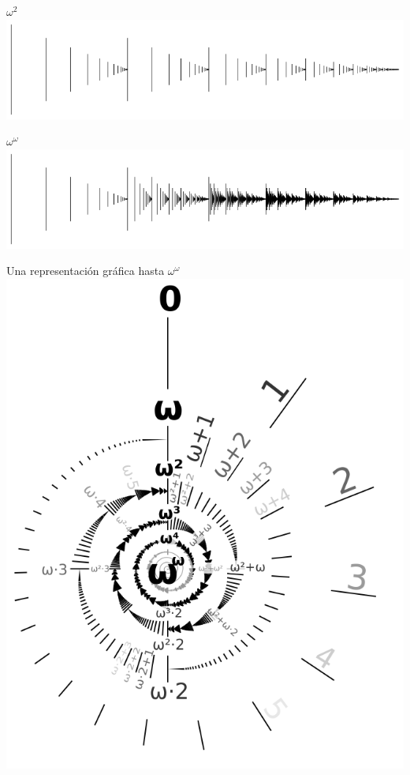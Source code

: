 \documentclass[10pt,spanish]{beamer}
\begin{document}
\begin{frame}{$\omega^2$}
\includegraphics[scale=0.4]{w^2.png}
\end{frame}

\begin{frame}{$\omega^\omega$}
\includegraphics[scale=0.4]{w^w.png}
\end{frame}

\begin{frame}{Una representación gráfica hasta $\omega^\omega$}
	\includegraphics[scale=0.42]{spiral.png}
\end{frame}
\end{document}
